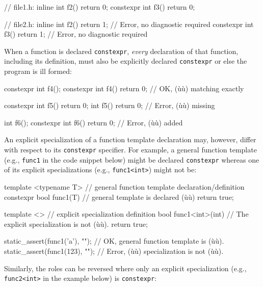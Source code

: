 \begin{emcppslisting}
// file1.h:
          inline int f2() { return 0; }
       constexpr int f3() { return 0; }

// file2.h:
          inline int f2() { return 1; }  // Error, no diagnostic required
       constexpr int f3() { return 1; }  // Error, no diagnostic required
\end{emcppslisting}


\noindent When a function is declared \lstinline!constexpr!, \emph{every} declaration
of that function, including its definition, must also be explicitly
declared \lstinline!constexpr! or else the program is ill formed:

\begin{emcppslisting}
constexpr int f4();
constexpr int f4() { return 0; }  // OK, (ù{}ù) matching exactly

constexpr int f5() { return 0; }
          int f5() { return 0; }  // Error, (ù{}ù) missing

          int f6();
constexpr int f6() { return 0; }  // Error, (ù{}ù) added
\end{emcppslisting}


\noindent An explicit specialization of a function template declaration may,
however, differ with respect to its \lstinline!constexpr! specifier. For
example, a general function template (e.g., \lstinline!func1! in the code
snippet below) might be declared \lstinline!constexpr! whereas one of its
explicit specializations (e.g., \lstinline!func1<int>!) might not be:

\begin{emcppslisting}
template <typename T>    // general function template declaration/definition
constexpr bool func1(T)  // general template is declared (ù{}ù)
{
    return true;
}

template <>              // explicit specialization definition
bool func1<int>(int)     // The explicit specialization is not (ù{}ù).
{
    return true;
}

static_assert(func1('a'), "");  // OK, general function template is (ù{}ù).
static_assert(func1(123), "");  // Error, (ù{}ù) specialization is not (ù{}ù).
\end{emcppslisting}


\noindent Similarly, the roles can be reversed where only an explicit
specialization (e.g., \lstinline!func2<int>! in the example below) is
\lstinline!constexpr!:


